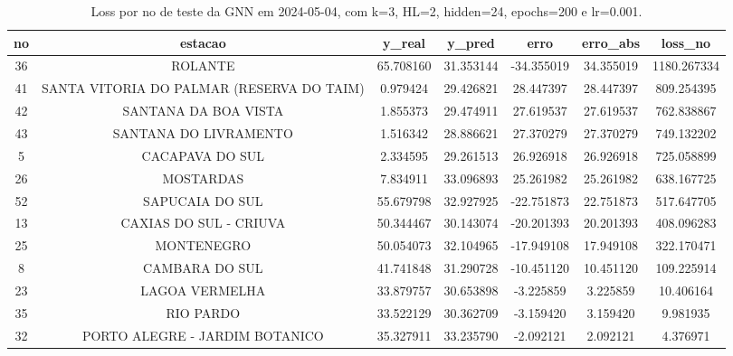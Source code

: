 \begin{table}[h]
\centering
\caption{Loss por no de teste da GNN em 2024-05-04, com k=3, HL=2, hidden=24, epochs=200 e lr=0.001.}
\label{tab:gnn_loss_k3_hl2_h24_e200_d20240504}
\begin{tabular}{ccccccc}
\toprule
no & estacao & y\_real & y\_pred & erro & erro\_abs & loss\_no \\
\midrule
36 & ROLANTE & 65.708160 & 31.353144 & -34.355019 & 34.355019 & 1180.267334 \\
41 & SANTA VITORIA DO PALMAR (RESERVA DO TAIM) & 0.979424 & 29.426821 & 28.447397 & 28.447397 & 809.254395 \\
42 & SANTANA DA BOA VISTA & 1.855373 & 29.474911 & 27.619537 & 27.619537 & 762.838867 \\
43 & SANTANA DO LIVRAMENTO & 1.516342 & 28.886621 & 27.370279 & 27.370279 & 749.132202 \\
5 & CACAPAVA DO SUL & 2.334595 & 29.261513 & 26.926918 & 26.926918 & 725.058899 \\
26 & MOSTARDAS & 7.834911 & 33.096893 & 25.261982 & 25.261982 & 638.167725 \\
52 & SAPUCAIA DO SUL & 55.679798 & 32.927925 & -22.751873 & 22.751873 & 517.647705 \\
13 & CAXIAS DO SUL - CRIUVA & 50.344467 & 30.143074 & -20.201393 & 20.201393 & 408.096283 \\
25 & MONTENEGRO & 50.054073 & 32.104965 & -17.949108 & 17.949108 & 322.170471 \\
8 & CAMBARA DO SUL & 41.741848 & 31.290728 & -10.451120 & 10.451120 & 109.225914 \\
23 & LAGOA VERMELHA & 33.879757 & 30.653898 & -3.225859 & 3.225859 & 10.406164 \\
35 & RIO PARDO & 33.522129 & 30.362709 & -3.159420 & 3.159420 & 9.981935 \\
32 & PORTO ALEGRE - JARDIM BOTANICO & 35.327911 & 33.235790 & -2.092121 & 2.092121 & 4.376971 \\
\bottomrule
\end{tabular}
\end{table}
